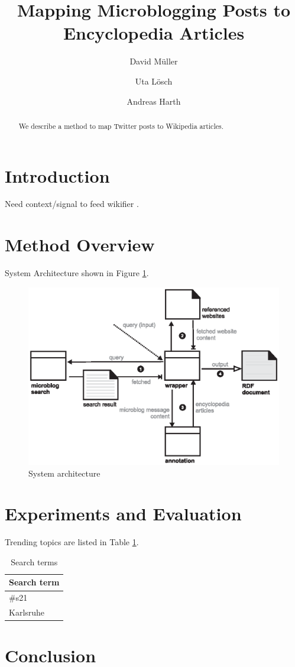 \documentclass[a4paper]{article}
\title{Mapping Microblogging Posts to Encyclopedia Articles}
\author{David M\"{u}ller \and Uta L\"{o}sch \and Andreas Harth}
\begin{document}
\maketitle

\begin{abstract}
We describe a method to map Twitter posts to Wikipedia articles.
\end{abstract}

\section{Introduction}

Need context/signal to feed wikifier \cite{key:wikifier}.

\section{Method Overview}

System Architecture shown in Figure \ref{fig:arch}.

\begin{figure}[htb]
  \centering
  \includegraphics[width=.6\linewidth]{architecture.eps}
  \caption{System architecture}
  \label{fig:arch}
\end{figure}


\section{Experiments and Evaluation}

Trending topics are listed in Table \ref{tbl:terms}.

\begin{table}[ht*]
\centering
\begin{tabular}{ l }
Search term                    \\
\hline
\#s21 \\
Karlsruhe\\
\end{tabular}
\caption{Search terms}\label{tbl:terms}
\end{table}

\section{Conclusion}







\end{document}
